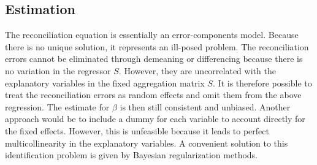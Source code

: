 \documentclass[a4paper,fleqn,11pt]{article}
\begin{document}
\subsection{Estimation}
The reconciliation equation is essentially an error-components model. Because there is no unique solution, it represents an ill-posed problem. The reconciliation errors cannot be eliminated through demeaning or differencing because there is no variation in the regressor $S$. However, they are uncorrelated with the explanatory variables in the fixed aggregation matrix $S$. It is therefore possible to treat the reconciliation errors as random effects and omit them from the above regression. The estimate for $\beta$ is then still consistent and unbiased. Another approach would be to include a dummy for each variable to account directly for the fixed effects. However, this is unfeasible because it leads to perfect multicollinearity in the explanatory variables. A convenient solution to this identification problem is given by Bayesian regularization methods.\\
\end{document}
